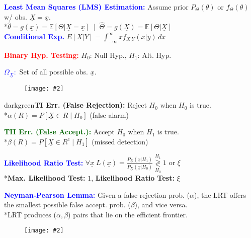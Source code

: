 \documentclass[5pt]{extarticle} %
\newcommand{\customFigure}[3][]{
    \vspace{-2em}
    \begin{figure}[H]
        \centering
        \texttt{[image: \#2]}
    \end{figure}
    \vspace{-2em}
}
\begin{document}
\begin{paracol}{3}
{    \textcolor{blue}{\textbf{Least Mean Squares (LMS) Estimation:}} Assume prior $P_\Theta (\theta)$ or $f_\Theta (\theta)$ w/ obs. $\underline{X} = \underline{x}$. \\
    *$\hat{\theta} = g(\underline{x}) = \mathbb{E} [\Theta | \underline{X} = \underline{x}] \; \mid \; \hat{\Theta} = g(\underline{X}) = \mathbb{E} [\Theta | \underline{X}]$ \\

    \textcolor{blue}{\textbf{Conditional Exp.}} $E[X|Y] = \int_{-\infty}^{\infty} x f_{X|Y} (x|y) \, dx$

    \textcolor{red}{\textbf{Binary Hyp. Testing:}} $H_0$: Null Hyp., $H_1$: Alt. Hyp. 

    \textcolor{blue}{$\Omega_{\underline{X}}:$} Set of all possible obs. $\underline{x}$.

    \customFigure[0.11]{../Images/TB_1.png}
    
    \textcolor{darkgreen}{\textbf{TI Err. (False Rejection):}} Reject $H_0$ when $H_0$ is true. \\
    *$\alpha(R) = P[\underline{X} \in R \mid H_0]$ (false alarm)

    \textcolor{darkgreen}{\textbf{TII Err. (False Accept.):}} Accept $H_0$ when $H_1$ is true. \\
    *$\beta(R) = P[\underline{X} \in R^c \mid H_1]$ (missed detection)

    \textcolor{blue}{\textbf{Likelihood Ratio Test:}} $\forall \underline{x} \; L(\underline{x}) = \frac{P_{\underline{X}} (\underline{x}|H_1)}{P_{\underline{X}} (\underline{x}|H_0)} \overset{H_1}{\underset{H_0}{\gtrless}} 1 \text{ or } \xi$ \\
    *\textbf{Max. Likelihood Test:} $1$, \textbf{Likelihood Ratio Test:} $\xi$

    \textcolor{blue}{\textbf{Neyman-Pearson Lemma:}} Given a false rejection prob. ($\alpha$), the LRT offers the smallest possible false accept. prob. ($\beta$), and vice versa. \\
    *LRT produces ($\alpha,\beta$) pairs that lie on the efficient frontier.

    \customFigure[0.1]{../Images/L10_0.png}{}
    

}
\end{paracol}
\end{document}
